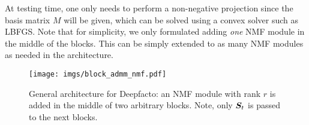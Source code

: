 At testing time, one only needs to perform a non-negative projection since the basis matrix $M$ will be given, which can be solved using a convex solver such as LBFGS. Note that for simplicity, we only formulated adding \emph{one} NMF module in the middle of the blocks. This can be simply extended to as many NMF modules as needed in the architecture.

\begin{figure}[t!]
\begin{center}
\centerline{
\texttt{[image: imgs/block\_admm\_nmf.pdf]}
}
 \caption{General architecture for Deepfacto: an NMF module with rank $r$ is added in the middle of two arbitrary blocks. Note, only ${\bm{S}}_t$ is passed to the next blocks.}
\label{fig:deepfacto}
\end{center}
\end{figure}

